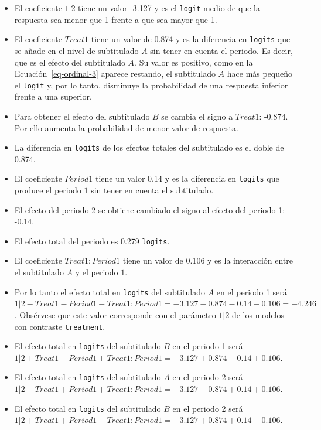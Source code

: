 \documentclass[
  12pt,
  a4paper,
  extrafontsizes,
  onecolumn,
  openright,
  table]{memoir}
\providecommand{\tightlist}{%
  \setlength{\itemsep}{0pt}\setlength{\parskip}{0pt}}\usepackage{longtable,booktabs,array}
\begin{document}
\begin{itemize}
\tightlist
\item
  El coeficiente \(1|2\) tiene un valor -3.127 y es el \texttt{logit}
  medio de que la respuesta sea menor que 1 frente a que sea mayor que
  1.
\item
  El coeficiente \(Treat1\) tiene un valor de 0.874 y es la diferencia
  en \texttt{logits} que se añade en el nivel de subtitulado \(A\) sin
  tener en cuenta el periodo. Es decir, que es el efecto del subtitulado
  \(A\). Su valor es positivo, como en la Ecuación~\ref{eq-ordinal-3}
  aparece restando, el subtitulado \(A\) hace más pequeño el
  \texttt{logit} y, por lo tanto, disminuye la probabilidad de una
  respuesta inferior frente a una superior.
\item
  Para obtener el efecto del subtitulado \(B\) se cambia el signo a
  \(Treat1\): -0.874. Por ello aumenta la probabilidad de menor valor de
  respuesta.
\item
  La diferencia en \texttt{logits} de los efectos totales del
  subtitulado es el doble de 0.874.
\item
  El coeficiente \(Period1\) tiene un valor 0.14 y es la diferencia en
  \texttt{logits} que produce el periodo \(1\) sin tener en cuenta el
  subtitulado.
\item
  El efecto del periodo \(2\) se obtiene cambiado el signo al efecto del
  periodo 1: -0.14.
\item
  El efecto total del periodo es 0.279 \texttt{logits}.
\item
  El coeficiente \(Treat1:Period1\) tiene un valor de 0.106 y es la
  interacción entre el subtitulado \(A\) y el periodo \(1\).
\item
  Por lo tanto el efecto total en \texttt{logits} del subtitulado \(A\)
  en el periodo 1 será
  \(1|2 - Treat1 - Period1 - Treat1:Period1 = -3.127 - 0.874 - 0.14 - 0.106 = -4.246\).
  Obsérvese que este valor corresponde con el parámetro \(1|2\) de los
  modelos con contraste \texttt{treatment}.
\item
  El efecto total en \texttt{logits} del subtitulado \(B\) en el periodo
  1 será
  \(1|2 + Treat1 - Period1 + Treat1:Period1 = -3.127 + 0.874 - 0.14 + 0.106\).
\item
  El efecto total en \texttt{logits} del subtitulado \(A\) en el periodo
  2 será
  \(1|2 - Treat1 + Period1 + Treat1:Period1 = -3.127 - 0.874 + 0.14 + 0.106\).
\item
  El efecto total en \texttt{logits} del subtitulado \(B\) en el periodo
  2 será
  \(1|2 + Treat1 + Period1 - Treat1:Period1 = -3.127 + 0.874 + 0.14 - 0.106\).
\end{itemize}
\end{document}
